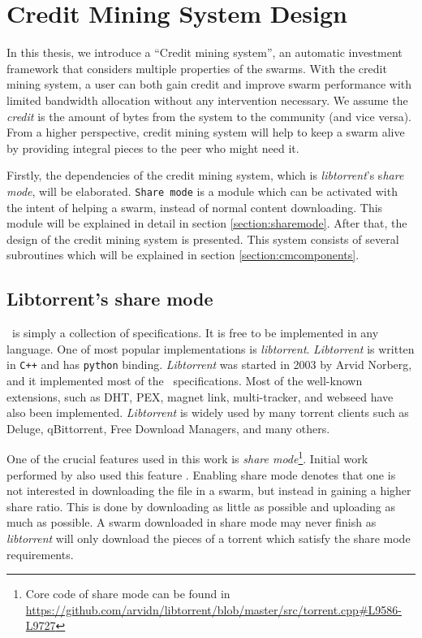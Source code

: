 \chapter{Credit Mining System Design}
\label{chp:design}

In this thesis, we introduce a ``Credit mining system'', an automatic investment framework that considers multiple properties of the swarms. With the credit mining system, a user can both gain credit and improve swarm performance with limited bandwidth allocation without any intervention necessary. We assume the \textit{credit} is the amount of bytes from the system to the community (and vice versa). From a higher perspective, credit mining system will help to keep a swarm alive by providing integral pieces to the peer who might need it. 

Firstly, the dependencies of the credit mining system, which is \textit{libtorrent}'s s\textit{hare mode}, will be elaborated. \texttt{Share mode} is a module which can be activated with the intent of helping a swarm, instead of normal content downloading. This module will be explained in detail in section \ref{section:sharemode}. After that, the design of the credit mining system is presented. This system consists of several subroutines which will be explained in section \ref{section:cmcomponents}. 

\section{Libtorrent's share mode}
\label{section:libtorrent}
\label{section:sharemode}
\bt~is simply a collection of specifications. It is free to be implemented in any language. One of most popular implementations is \textit{libtorrent}. \textit{Libtorrent} is written in \texttt{C++} and  has \texttt{python} binding. \textit{Libtorrent} was started in 2003 by Arvid Norberg, and it implemented most of the \bt~specifications. Most of the well-known extensions, such as DHT, PEX, magnet link, multi-tracker, and webseed have also been implemented. \textit{Libtorrent} is widely used by many torrent clients such as Deluge, qBittorrent, Free Download Managers, and many others.

One of the crucial features used in this work is \textit{share mode}\footnote{Core code of share mode can be found in \url{https://github.com/arvidn/libtorrent/blob/master/src/torrent.cpp\#L9586-L9727}}. Initial work performed by \citeauthor{2015:creditmining:capota} also used this feature \cite{2015:creditmining:capota}. Enabling share mode denotes that one is not interested in downloading the file in a swarm, but instead in gaining a higher share ratio. This is done by downloading as little as possible and uploading as much as possible. A swarm downloaded in share mode may never finish as \textit{libtorrent} will only download the pieces of a torrent which satisfy the share mode requirements.

